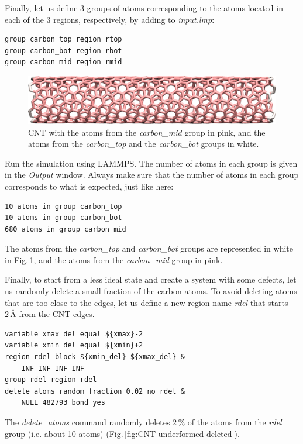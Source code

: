 \documentclass[9pt,tutorial]{livecoms}
\begin{document}
Finally, let us define 3 groups of atoms corresponding to the atoms located
in each of the 3 regions, respectively, by adding to \textit{input.lmp}:
{\normalsize \begin{verbatim}
group carbon_top region rtop
group carbon_bot region rbot
group carbon_mid region rmid
\end{verbatim}}

\begin{figure}
\centering
\includegraphics[width=\linewidth]{CNT-underformed}
\caption{CNT with the atoms from the \textit{carbon\_mid} group in pink,
and the atoms from the \textit{carbon\_top} and the \textit{carbon\_bot}
groups in white.}
\label{fig:CNT-underformed}
\end{figure}

Run the simulation using LAMMPS. The number of atoms in each group is given in
the \textit{Output} window. Always make sure that the number
of atoms in each group corresponds to what is expected, just like here:
{\normalsize \begin{verbatim}
10 atoms in group carbon_top
10 atoms in group carbon_bot
680 atoms in group carbon_mid
\end{verbatim}}
The atoms from the \textit{carbon\_top} and \textit{carbon\_bot} groups are
represented in white in Fig.\,\ref{fig:CNT-underformed}, and the atoms from
the \textit{carbon\_mid} group in pink.

Finally, to start from a less ideal state and create a system with some defects,
let us randomly delete a small fraction of the carbon atoms. To avoid deleting
atoms that are too close to the edges, let us define a new region name \textit{rdel}
that starts $2\,\text{\AA{}}$ from the CNT edges.
{\normalsize \begin{verbatim}
variable xmax_del equal ${xmax}-2
variable xmin_del equal ${xmin}+2
region rdel block ${xmin_del} ${xmax_del} &
    INF INF INF INF
group rdel region rdel
delete_atoms random fraction 0.02 no rdel &
    NULL 482793 bond yes
\end{verbatim}}
The \textit{delete\_atoms} command randomly deletes $2\,\%$ of the atoms from
the \textit{rdel} group (i.e. about 10 atoms) (Fig.\,\ref{fig:CNT-underformed-deleted}).
\end{document}
